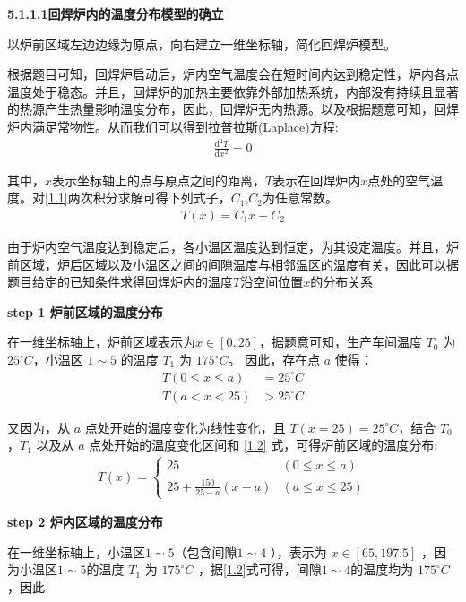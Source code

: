 \documentclass[../main.tex]{subfiles}
\begin{document}

\noindent \textbf{5.1.1.1回焊炉内的温度分布模型的确立}

\par 以炉前区域左边边缘为原点，向右建立一维坐标轴，简化回焊炉模型。
\par 根据题目可知，回焊炉启动后，炉内空气温度会在短时间内达到稳定性，炉内各点温度处于稳态。并且，回焊炉的加热主要依靠外部加热系统，内部没有持续且显著的热源产生热量影响温度分布，因此，回焊炉无内热源。以及根据题意可知，回焊炉内满足常物性。从而我们可以得到拉普拉斯(Laplace)方程:
\begin{align}\label{1.1}
    \frac{\mathrm{d}^2T}{\mathrm{d}x^2}=0
\end{align}
\par 其中，$x$表示坐标轴上的点与原点之间的距离，$T$表示在回焊炉内$x$点处的空气温度。对\eqref{1.1}两次积分求解可得下列式子，$C_1$,$C_2$为任意常数。
\begin{align}\label{1.2}
    T\left( x \right) =C_1x+C_2 
\end{align}
\par 由于炉内空气温度达到稳定后，各小温区温度达到恒定，为其设定温度。并且，炉前区域，炉后区域以及小温区之间的间隙温度与相邻温区的温度有关，因此可以据题目给定的已知条件求得回焊炉内的温度$T$沿空间位置$x$的分布关系
\par \textbf{step 1 炉前区域的温度分布}
\par 在一维坐标轴上，炉前区域表示为$x\in \left[ 0,25 \right] $，据题意可知，生产车间温度 \(T_0\) 为 \(25^{\circ}C\)，小温区 \(1\sim5\) 的温度 \(T_1\) 为 \(175^{\circ}C\)。
因此，存在点 \(a\) 使得：
\begin{align}
T(0\leq x\leq a)& = 25^{\circ}C \label{1.3}\\
T(a < x < 25)&> 25^{\circ}C  \label{1.4}
\end{align}
\par 又因为，从 \(a\) 点处开始的温度变化为线性变化，且 \(T(x = 25)=25^{\circ}C\)，结合 \(T_0\)，\(T_1\) 以及从 \(a\) 点处开始的温度变化区间和 \eqref{1.2} 式，可得炉前区域的温度分布:
\begin{gather}\label{1.5}
T(x)=\begin{cases}
25 & (0\leq x\leq a) \\
25+\frac{150}{25 - a}(x - a)&(a \leq x \leq 25)
\end{cases}
\end{gather}
\par \textbf{step 2 炉内区域的温度分布}
\par 在一维坐标轴上，小温区$1\sim 5$（包含间隙$1 \sim4$ ），表示为 \(x\in[65,197.5]\) ，因为小温区$1\sim5$的温度 \(T_{1}\) 为 \(175^{\circ}C\) ，据\eqref{1.2}式可得，间隙$1\sim4$的温度均为 \(175^{\circ}C\) ，因此
\end{document}
